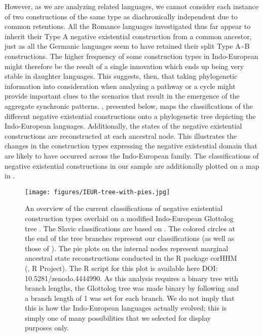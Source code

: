 \documentclass[output=paper,colorlinks,citecolor=brown]{langscibook}
\begin{document}
However, as we are analyzing related languages, we cannot consider each
instance of two constructions of the same type as diachronically
independent due to common retentions. All the Romance languages
investigated thus far appear to inherit their Type A negative existential
construction from a common ancestor, just as all the Germanic languages
seem to have retained their split Type A{\textasciitilde}B constructions.
The higher frequency of some construction types in Indo-European might
therefore be the result of a single innovation which ends up being very
stable in daughter languages. This suggests, then, that taking phylogenetic
information into consideration when analyzing a pathway or a cycle might
provide important clues to the scenarios that result in the emergence of
the aggregate synchronic patterns. , presented below,
maps the classifications of the different negative existential
constructions onto a phylogenetic tree depicting the Indo-European
languages. Additionally, the states of the negative existential
constructions are reconstructed at each ancestral node. This illustrates
the changes in the construction types expressing the negative existential
domain that are likely to have occurred across the Indo-European
family. The classifications of negative existential constructions in our sample are additionally plotted on a map in .

\begin{figure}
\caption{An overview of the current classifications of negative existential
construction types overlaid on a modified Indo-European Glottolog tree
\citep{HammarstromBank2018-ieur}. The Slavic classifications are based on
\citet{Veselinova2014}. The colored circles at the end of the tree branches
represent our classifications (as well as those of
\citealt{Veselinova2014}). The pie plots on the internal nodes represent
marginal ancestral state reconstructions conducted in the R package corHHM
(\citealt{Beaulieu2013}, R Project\nocite{RDev2008}). The R script for this plot is
available here DOI: 10.5281/zenodo.4444990. As this analysis requires a binary
tree with branch lengths, the Glottolog tree was made binary by following
\citet{BouckaertLemey2012} and a branch length of 1 was set for each branch. We do not imply that this is how the Indo-European languages actually evolved; this is simply one of many possibilities that we selected for display purposes only.} 
\label{fig:ieur-tree}
\texttt{[image: figures/IEUR-tree-with-pies.jpg]}
\end{figure}
\end{document}
